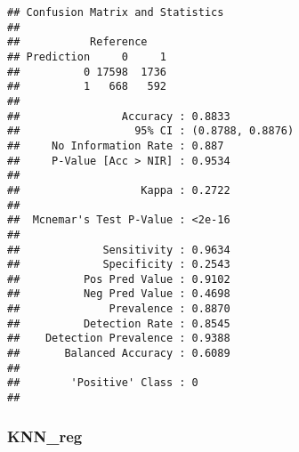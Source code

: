 \documentclass[
]{article}
\newenvironment{Shaded}{\begin{snugshade}}{\end{snugshade}}
\newcommand{\DecValTok}[1]{\textcolor[rgb]{0.00,0.00,0.81}{#1}}
\newcommand{\FloatTok}[1]{\textcolor[rgb]{0.00,0.00,0.81}{#1}}
\newcommand{\FunctionTok}[1]{\textcolor[rgb]{0.00,0.00,0.00}{#1}}
\newcommand{\NormalTok}[1]{#1}
\newcommand{\OtherTok}[1]{\textcolor[rgb]{0.56,0.35,0.01}{#1}}
\newcommand{\SpecialCharTok}[1]{\textcolor[rgb]{0.00,0.00,0.00}{#1}}
\newcommand{\StringTok}[1]{\textcolor[rgb]{0.31,0.60,0.02}{#1}}
\begin{document}
\begin{verbatim}
## Confusion Matrix and Statistics
## 
##           Reference
## Prediction     0     1
##          0 17598  1736
##          1   668   592
##                                           
##                Accuracy : 0.8833          
##                  95% CI : (0.8788, 0.8876)
##     No Information Rate : 0.887           
##     P-Value [Acc > NIR] : 0.9534          
##                                           
##                   Kappa : 0.2722          
##                                           
##  Mcnemar's Test P-Value : <2e-16          
##                                           
##             Sensitivity : 0.9634          
##             Specificity : 0.2543          
##          Pos Pred Value : 0.9102          
##          Neg Pred Value : 0.4698          
##              Prevalence : 0.8870          
##          Detection Rate : 0.8545          
##    Detection Prevalence : 0.9388          
##       Balanced Accuracy : 0.6089          
##                                           
##        'Positive' Class : 0               
## 
\end{verbatim}

\hypertarget{knn_reg}{%
\subsubsection{KNN\_reg}\label{knn_reg}}

\begin{Shaded}
\end{Shaded}
\end{document}
